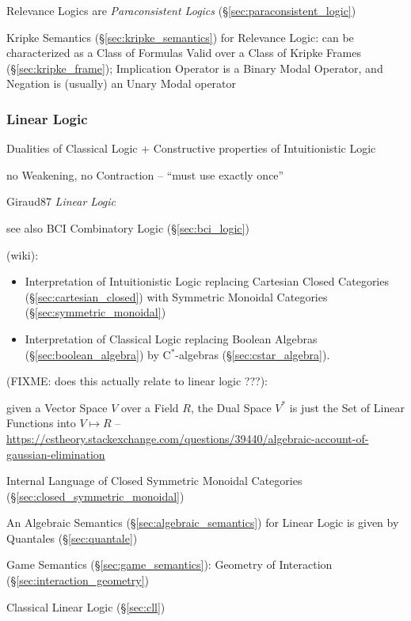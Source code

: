 Relevance Logics are \emph{Paraconsistent Logics}
(\S\ref{sec:paraconsistent_logic})

Kripke Semantics (\S\ref{sec:kripke_semantics}) for Relevance Logic:
can be characterized as a Class of Formulas Valid over a Class of
Kripke Frames (\S\ref{sec:kripke_frame}); Implication Operator is a
Binary Modal Operator, and Negation is (usually) an Unary Modal
operator



\subsubsection{Linear Logic}\label{sec:linear_logic}

Dualities of Classical Logic + Constructive properties of Intuitionistic Logic

no Weakening, no Contraction -- ``must use exactly once''

Giraud87 \emph{Linear Logic}

\fist see also BCI Combinatory Logic (\S\ref{sec:bci_logic})

(wiki):

\begin{itemize}
\item Interpretation of Intuitionistic Logic replacing Cartesian Closed
  Categories (\S\ref{sec:cartesian_closed}) with Symmetric Monoidal
  Categories (\S\ref{sec:symmetric_monoidal})
\item Interpretation of Classical Logic replacing Boolean Algebras
  (\S\ref{sec:boolean_algebra}) by C$^*$-algebras
  (\S\ref{sec:cstar_algebra}).
\end{itemize}

(FIXME: does this actually relate to linear logic ???):

given a Vector Space $V$ over a Field $R$, the Dual Space $V^*$ is just the Set
of Linear Functions into $V \mapsto R$
--\url{https://cstheory.stackexchange.com/questions/39440/algebraic-account-of-gaussian-elimination}


\asterism


Internal Language of Closed Symmetric Monoidal Categories
(\S\ref{sec:closed_symmetric_monoidal})

An Algebraic Semantics (\S\ref{sec:algebraic_semantics}) for Linear
Logic is given by Quantales (\S\ref{sec:quantale})

Game Semantics (\S\ref{sec:game_semantics}): Geometry of Interaction
(\S\ref{sec:interaction_geometry})

Classical Linear Logic (\S\ref{sec:cll})

